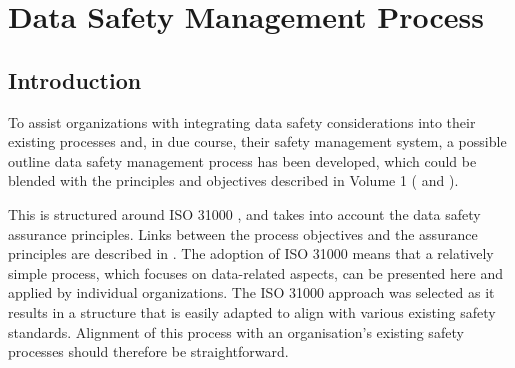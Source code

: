 %
%
\chapter{Data Safety Management Process} \label{bkm:process}


\section{Introduction}
To assist organizations with integrating data safety considerations into their existing processes and,
in due course, their safety management system, a possible outline data safety management process has been developed, which could be blended with the principles and objectives described in Volume 1 ( and ).

This is structured around ISO 31000 \cite{citation:iso310002018risk}, and takes into account the data safety assurance principles.
Links between the process objectives and the assurance principles are described in . The
adoption of ISO 31000 means that a relatively simple process, which focuses on data-related
aspects, can be presented here and applied by individual organizations. The ISO 31000 approach was selected as it results in a structure that is easily adapted to align with various existing safety standards. Alignment of this process with an organisation's existing safety processes should therefore be straightforward.

